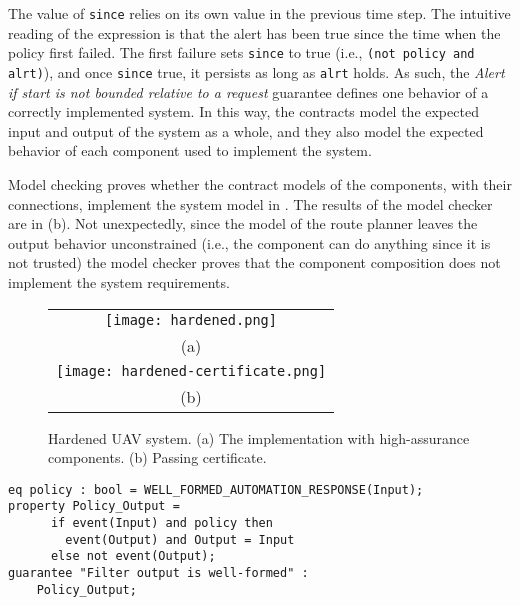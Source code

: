 The value of \texttt{since} relies on its own value in the previous time step. The intuitive reading of the expression is that the alert has been true since the time when the policy first failed. The first failure sets \texttt{since} to true (i.e., \texttt{(not policy and alrt)}), and once \texttt{since} true, it persists as long as \texttt{alrt} holds. As such, the \emph{Alert if start is not bounded relative to a request} guarantee defines one behavior of a correctly implemented system. In this way, the contracts model the expected input and output of the system as a whole, and they also model the expected behavior of each component used to implement the system.

Model checking proves whether the contract models of the components, with their connections, implement the system model in . The results of the model checker are in (b). Not unexpectedly, since the model of the route planner leaves the output behavior unconstrained (i.e., the component can do anything since it is not trusted) the model checker proves that the component composition does not implement the system requirements.

\begin{figure*}
  \begin{center}
    \begin{tabular}{c}
      \texttt{[image: hardened.png]} \\
      (a) \\
      \texttt{[image: hardened-certificate.png]} \\
      (b)
    \end{tabular}
  \end{center}
  \caption{Hardened UAV system. (a) The implementation with high-assurance components. (b) Passing certificate.}
  \label{fig:hardened}
\end{figure*}

\newsavebox{\flt}
\begin{lrbox}{\flt}
\begin{lstlisting}[style=agree]
eq policy : bool = WELL_FORMED_AUTOMATION_RESPONSE(Input);
property Policy_Output = 
      if event(Input) and policy then 
        event(Output) and Output = Input
      else not event(Output);
guarantee "Filter output is well-formed" :
    Policy_Output;
\end{lstlisting}
\end{lrbox}

